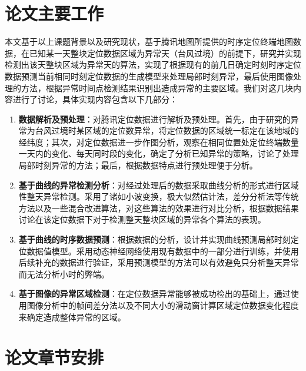 \documentclass[a4paper,AutoFakeBold,oneside,12pt]{book}
\begin{document}
\section{论文主要工作}

本文基于以上课题背景以及研究现状，基于腾讯地图所提供的时序定位终端地图数据，在已知某一天整块定位数据区域为异常天（台风过境）的前提下，研究并实现检测出该天整块区域为异常天的算法，实现了根据现有的前几日确定时刻时序定位数据预测当前相同时刻定位数据的生成模型来处理局部时刻异常，最后使用图像处理的方法，根据异常时间点检测结果识别出造成异常的主要区域。我们对这几块内容进行了讨论，具体实现内容包含以下几部分：
\begin{enumerate}
\item \textbf{数据解析及预处理}：对腾讯定位数据进行解析及预处理。首先，由于研究的异常为台风过境时某区域的定位数异常，将定位数据的区域统一标定在该地域的经纬度；其次，对定位数据进一步作图分析，观察在相同位置处定位终端数量一天内的变化、每天同时段的变化，确定了分析已知异常的策略，讨论了处理局部时刻异常的方法；最后，根据数据特点进行预处理便于分析。
\item \textbf{基于曲线的异常检测分析}：对经过处理后的数据采取曲线分析的形式进行区域性整天异常检测。采用了诸如小波变换，极大似然估计法，差分分析法等传统方法以及一些混合改进算法，对这些算法的效果进行对比分析，根据数据结果讨论在该定位数据下对于检测整天整块区域的异常各个算法的表现。
\item \textbf{基于曲线的时序数据预测}：根据数据的分析，设计并实现曲线预测局部时刻定位数据值模型。采用动态神经网络使用现有数据中的一部分进行训练，并使用后续补充的数据进行验证，采用预测模型的方法可以有效避免只分析整天异常而无法分析小时的弊端。
\item \textbf{基于图像的异常区域检测}：在定位数据异常能够被成功检出的基础上，通过使用图像分析中的帧间差分法以及不同大小的滑动窗计算区域定位数据变化程度来确定造成整体异常的区域。
\end{enumerate}

\section{论文章节安排}
\end{document}

